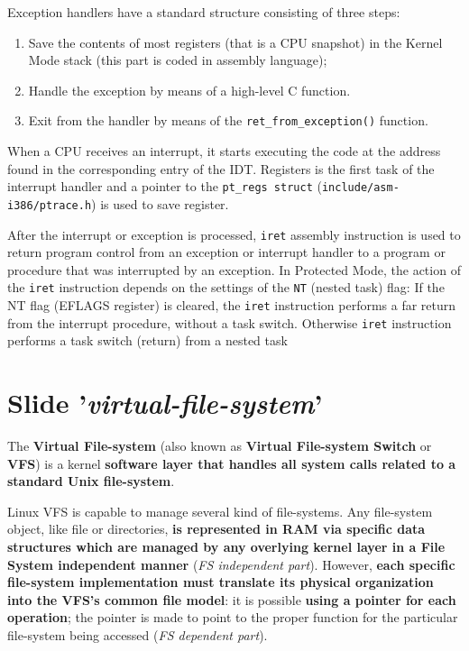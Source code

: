 \documentclass[10pt,a4paper]{article}
\begin{document}
Exception handlers have a standard structure consisting of three steps:
\begin{enumerate}
\item Save the contents of most registers (that is a CPU snapshot) in the Kernel Mode stack (this part is coded in assembly language);
\item Handle the exception by means of a high-level C function.
\item Exit from the handler by means of the \texttt{ret\_from\_exception()} function.
\end{enumerate}

When a CPU receives an interrupt, it starts executing the code at the address found in the corresponding entry of the IDT. Registers is the first task of the interrupt handler and a pointer to the \texttt{pt\_regs struct} (\texttt{include/asm-i386/ptrace.h}) is used to save register.

After the interrupt or exception is processed, \texttt{iret} assembly instruction is used to return program control from an exception or interrupt handler to a program or procedure that was interrupted by an exception. In Protected Mode, the action of the \texttt{iret} instruction depends on the settings of the \texttt{NT} (nested task) flag:
If the NT flag (EFLAGS register) is cleared, the \texttt{iret} instruction performs a far return from the interrupt procedure, without a task switch. Otherwise \texttt{iret} instruction performs a task switch (return) from a nested task

\newpage
\section{Slide '\textit{virtual-file-system}'}

The \textbf{Virtual File-system} (also known as \textbf{Virtual File-system Switch} or \textbf{VFS}) is a kernel \textbf{software layer that handles all system calls related to a standard Unix file-system}. 

Linux VFS is capable to manage several kind of file-systems. Any file-system object, like file or directories, \textbf{is represented in RAM via specific data structures which are managed by any overlying kernel layer in a File System independent manner} (\textit{FS independent part}). However, \textbf{each specific file-system implementation must translate its physical organization into the VFS’s common file model}: it is possible \textbf{using a pointer for each operation}; the pointer is made to point to the proper function for the particular file-system being accessed (\textit{FS dependent part}).
\end{document}
